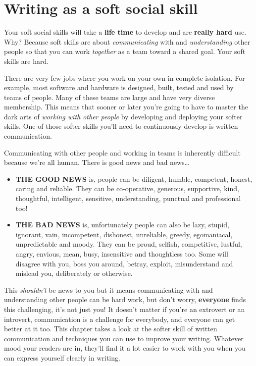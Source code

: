 \documentclass[
]{book}
\providecommand{\tightlist}{%
  \setlength{\itemsep}{0pt}\setlength{\parskip}{0pt}}
\begin{document}
\hypertarget{softwrite}{%
\section{Writing as a soft social skill}\label{softwrite}}

Your soft social skills will take a \textbf{life time} to develop and are \textbf{really hard} use. Why? Because soft skills are about \emph{communicating} with and \emph{understanding} other people so that you can work \emph{together} as a team toward a shared goal. Your soft skills are hard.

There are very few jobs where you work on your own in complete isolation. For example, most software and hardware is designed, built, tested and used by teams of people. Many of these teams are large and have very diverse membership. This means that sooner or later you're going to have to master the dark arts of \emph{working with other people} by developing and deploying your softer skills. One of those softer skills you'll need to continuously develop is written communication.

Communicating with other people and working in teams is inherently difficult because we're all human. There is good news and bad news\ldots{}

\begin{itemize}
\tightlist
\item
  \textbf{THE GOOD NEWS} is, people can be diligent, humble, competent, honest, caring and reliable. They can be co-operative, generous, supportive, kind, thoughtful, intelligent, sensitive, understanding, punctual and professional too!
\item
  \textbf{THE BAD NEWS} is, unfortunately people can also be lazy, stupid, ignorant, vain, incompetent, dishonest, unreliable, greedy, egomaniacal, unpredictable and moody. They can be proud, selfish, competitive, lustful, angry, envious, mean, busy, insensitive and thoughtless too. Some will disagree with you, boss you around, betray, exploit, misunderstand and mislead you, deliberately or otherwise. \citep{sevendeadly}
\end{itemize}

This \emph{shouldn't} be news to you but it means communicating with and understanding other people can be hard work, but don't worry, \textbf{everyone} finds this challenging, it's not just you! It doesn't matter if you're an extrovert or an introvert, communication is a challenge for everybody, and everyone can get better at it too. This chapter takes a look at the softer skill of written communication and techniques you can use to improve your writing. Whatever mood your readers are in, they'll find it a lot easier to work with you when you can express yourself clearly in writing.
\end{document}
